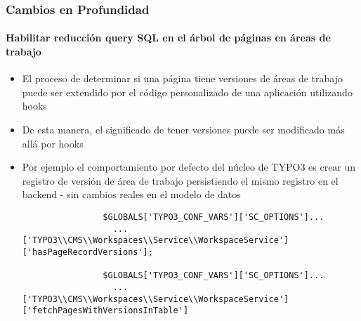\begin{frame}[fragile]
	\frametitle{Cambios en Profundidad}
	\framesubtitle{Habilitar reducción query SQL en el árbol de páginas en áreas de trabajo}

	\lstset{basicstyle=\tiny\ttfamily}

	\begin{itemize}

		\item El proceso de determinar si una página tiene versiones de áreas de trabajo
			puede ser extendido por el código personalizado de una aplicación utilizando hooks

		\item De esta manera, el significado de tener versiones puede ser modificado más allá por
		hooks

		\item Por ejemplo el comportamiento por defecto del núcleo de TYPO3 es crear
			un registro de versión de área de trabajo persistiendo el mismo registro en el
			backend - sin cambios reales en el modelo de datos

			\begin{lstlisting}
				$GLOBALS['TYPO3_CONF_VARS']['SC_OPTIONS']...
				  ...['TYPO3\\CMS\\Workspaces\\Service\\WorkspaceService']['hasPageRecordVersions'];

				$GLOBALS['TYPO3_CONF_VARS']['SC_OPTIONS']...
				  ...['TYPO3\\CMS\\Workspaces\\Service\\WorkspaceService']['fetchPagesWithVersionsInTable']
			\end{lstlisting}

	\end{itemize}

\end{frame}


